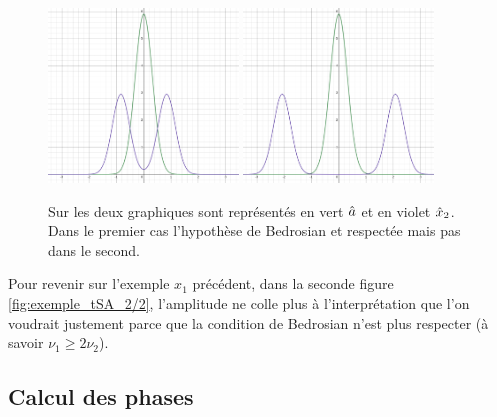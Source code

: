 \begin{figure}[h]\centering
	\includegraphics[width=0.45\textwidth]{fig/part-1/bedro condi 1.png} 
	\hfill
	\includegraphics[width=0.45\textwidth]{fig/part-1/bedro condi 2.png} 
	\caption{Sur les deux graphiques sont représentés en vert $\hat{a}$ et en violet $\hat{x}_2$. Dans le premier cas l'hypothèse de Bedrosian et respectée mais pas dans le second.}
	\label{fig:alising-ish}
\end{figure}


Pour revenir sur l'exemple $x_1$ précédent, dans la seconde figure \ref{fig:exemple_tSA_2/2}, l'amplitude ne colle plus à l'interprétation que l'on voudrait justement parce que la condition de Bedrosian n'est plus respecter (à savoir $\nu_1\geq 2\nu_2$). 




\subsection{Calcul des phases}\label{ann:demo_phases_2var}


